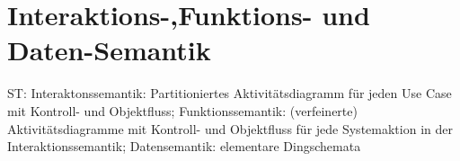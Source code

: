 \chapter{Interaktions-,Funktions- und Daten-Semantik}
ST: Interaktonssemantik: Partitioniertes Aktivitätsdiagramm für jeden Use
Case mit Kontroll- und Objektfluss;
Funktionssemantik: (verfeinerte) Aktivitätsdiagramme mit Kontroll- und
Objektfluss für jede Systemaktion in der Interaktionssemantik;
Datensemantik: elementare Dingschemata